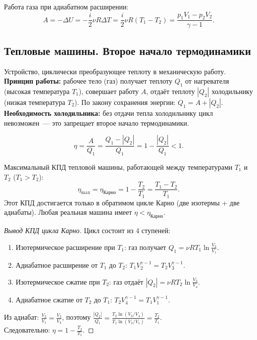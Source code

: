 \documentclass[12pt]{article}
\begin{document}
Работа газа при адиабатном расширении:
\[
	A = -\Delta U = -\frac{i}{2}\nu R\Delta T = \frac{i}{2}\nu R(T_1 - T_2) = \frac{p_1V_1 - p_2V_2}{\gamma - 1}.
\]

\subsection{Тепловые машины. Второе начало термодинамики}

\begin{definition}
	Устройство, циклически преобразующее теплоту в механическую работу.\\
	\textbf{Принцип работы:} рабочее тело (газ) получает теплоту $Q_1$ от нагревателя (высокая температура $T_1$), совершает работу $A$, отдаёт теплоту $|Q_2|$ холодильнику (низкая температура $T_2$). По закону сохранения энергии: $Q_1 = A + |Q_2|$.\\
	\textbf{Необходимость холодильника:} без отдачи тепла холодильнику цикл невозможен~--- это запрещает второе начало термодинамики.
\end{definition}

\begin{definition}
	\[
		\eta = \frac{A}{Q_1} = \frac{Q_1 - |Q_2|}{Q_1} = 1 - \frac{|Q_2|}{Q_1} < 1.
	\]
\end{definition}

\begin{theorem}[Карно]
	Максимальный КПД тепловой машины, работающей между температурами $T_1$ и $T_2$ ($T_1 > T_2$):
	\[
		\eta_{\max} = \eta_{\text{Карно}} = 1 - \frac{T_2}{T_1} = \frac{T_1 - T_2}{T_1}.
	\]
	Этот КПД достигается только в обратимом цикле Карно (две изотермы + две адиабаты). Любая реальная машина имеет $\eta < \eta_{\text{Карно}}$.
\end{theorem}
\begin{proof}[Вывод КПД цикла Карно]
	Цикл состоит из 4 ступеней:
	\begin{enumerate}
		\item Изотермическое расширение при $T_1$: газ получает $Q_1 = \nu RT_1\ln\frac{V_2}{V_1}$.
		\item Адиабатное расширение от $T_1$ до $T_2$: $T_1V_2^{\gamma-1} = T_2V_3^{\gamma-1}$.
		\item Изотермическое сжатие при $T_2$: газ отдаёт $|Q_2| = \nu RT_2\ln\frac{V_3}{V_4}$.
		\item Адиабатное сжатие от $T_2$ до $T_1$: $T_2V_4^{\gamma-1} = T_1V_1^{\gamma-1}$.
	\end{enumerate}
	Из адиабат: $\frac{V_2}{V_1} = \frac{V_3}{V_4}$, поэтому $\frac{|Q_2|}{Q_1} = \frac{T_2\ln(V_3/V_4)}{T_1\ln(V_2/V_1)} = \frac{T_2}{T_1}$.\\
	Следовательно: $\eta = 1 - \frac{T_2}{T_1}$.
\end{proof}
\end{document}
